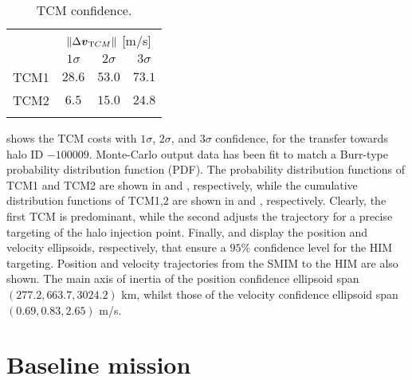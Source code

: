 %
\begin{table}[]
	\caption{TCM confidence.}
	\label{tab:TCMconfidence}
	\centering
	\begin{tabular}{cccc}
		\TOPlines
		\multirow{2}{*}{TCM} & \multicolumn{3}{c}{$\|\Delta\boldsymbol{v}_{\textrm TCM}\|$ [m/s]} \\
		& $1\sigma$ & $2\sigma$ & $3\sigma$ \\
		\MIDline
		TCM1 & $28.6$ & $53.0$ & $73.1$ \\
		TCM2 & $6.5$ & $15.0$ & $24.8$ \\
		\BOTTOMlines
	\end{tabular}
\end{table}
%
 shows the {TCM} costs with $1\sigma$, $2\sigma$, and $3\sigma$ confidence, for the transfer towards halo ID $-100009$. Monte-Carlo output data has been fit to match a Burr-type probability distribution function (PDF). The probability distribution functions of TCM1 and TCM2 are shown in  and , respectively, while the cumulative distribution functions of TCM1,2 are shown in  and , respectively. Clearly, the first {TCM} is predominant, while the second adjusts the trajectory for a precise targeting of the halo injection point. Finally,  and  display the position and velocity ellipsoids, respectively, that ensure a $95\%$ confidence level for the {HIM} targeting. Position and velocity trajectories from the {SMIM} to the {HIM} are also shown. The main axis of inertia of the position confidence ellipsoid span $(277.2,663.7,3024.2)$ km, whilst those of the velocity confidence ellipsoid span $(0.69,0.83,2.65)$ m/s.

\section{Baseline mission} \label{sec:baseline_mission}
